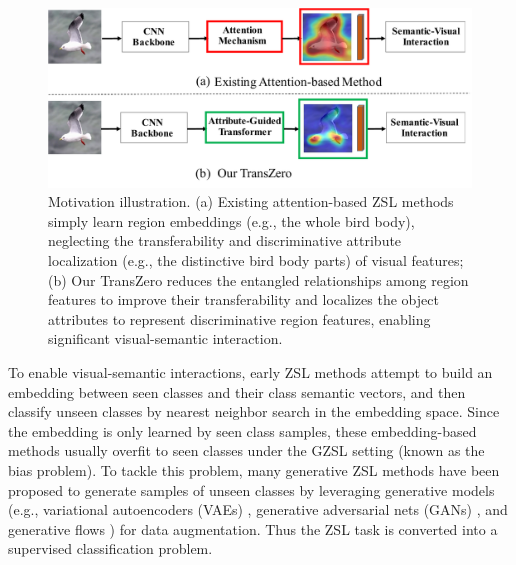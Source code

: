 \documentclass[letterpaper]{article} %
\begin{document}
	\begin{figure}[t]
		\centering
		\includegraphics[scale=0.34]{figures/motivation.pdf}\vspace{-2mm}
		\caption{Motivation illustration. (a) Existing attention-based ZSL methods simply learn region embeddings (e.g., the whole bird body), neglecting the transferability and discriminative attribute localization (e.g., the distinctive bird body parts) of visual features; (b) Our TransZero reduces the entangled relationships among region features to improve their transferability and localizes the object attributes to represent discriminative region features, enabling significant visual-semantic interaction.}
		\label{fig:motivation}
	\end{figure}
	
	To enable visual-semantic interactions, early ZSL methods attempt to build an embedding between seen classes and their class semantic vectors, and then classify unseen classes by nearest neighbor search in the embedding space. Since the embedding is only learned by seen class samples, these embedding-based methods usually overfit to seen classes under the GZSL setting (known as the bias problem). To tackle this problem, many generative ZSL methods have been proposed to generate samples of unseen classes by leveraging generative models (e.g., variational autoencoders (VAEs) \cite{Arora2018GeneralizedZL,Schnfeld2019GeneralizedZA,Chen2021HSVA}, generative adversarial nets (GANs) \cite{Xian2018FeatureGN,Xian2019FVAEGAND2AF,Chen2021FREE}, and generative flows \cite{Shen2020InvertibleZR}) for data augmentation. Thus the ZSL task is converted into a supervised classification problem.
	
\end{document}
